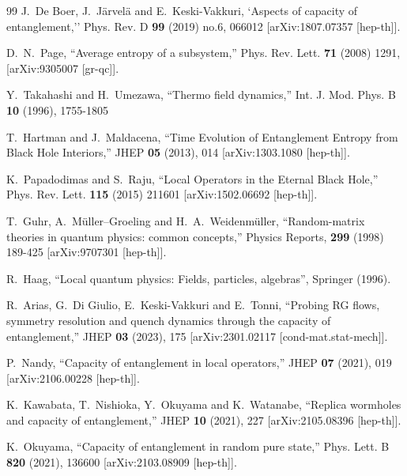 \documentclass[aps,prl,twocolumn,showpacs,preprintnumbers,amsmath,amssymb]{revtex4-1}
\begin{document}
\begin{thebibliography}{99}
J.~De Boer, J.~J\"arvel\"a and E.~Keski-Vakkuri,
`Aspects of capacity of entanglement,''
Phys. Rev. D \textbf{99} (2019) no.6, 066012
[arXiv:1807.07357 [hep-th]].

D.~N.~Page, ``Average entropy of a subsystem,''
Phys. Rev. Lett. \textbf{71} (2008) 1291,
[arXiv:9305007 [gr-qc]].
 
Y.~Takahashi and H.~Umezawa,
``Thermo field dynamics,''
Int. J. Mod. Phys. B \textbf{10} (1996), 1755-1805
  
T.~Hartman and J.~Maldacena,
``Time Evolution of Entanglement Entropy from Black Hole Interiors,''
JHEP \textbf{05} (2013), 014
[arXiv:1303.1080 [hep-th]].

K.~Papadodimas and S.~Raju, 
``Local Operators in the Eternal Black Hole,''
Phys. Rev. Lett. \textbf{115} (2015) 211601
[arXiv:1502.06692 [hep-th]].

T.~Guhr, A.~Müller–Groeling and H.~A.~Weidenmüller,
``Random-matrix theories in quantum physics: common concepts,''
Physics Reports, \textbf{299} (1998) 189-425
[arXiv:9707301 [hep-th]].

 R.~Haag, “Local quantum physics: Fields, particles, algebras”, Springer (1996).

R.~Arias, G.~Di Giulio, E.~Keski-Vakkuri and E.~Tonni,
``Probing RG flows, symmetry resolution and quench dynamics through the capacity of entanglement,''
JHEP \textbf{03} (2023), 175
[arXiv:2301.02117 [cond-mat.stat-mech]].

P.~Nandy,
``Capacity of entanglement in local operators,''
JHEP \textbf{07} (2021), 019
[arXiv:2106.00228 [hep-th]].

K.~Kawabata, T.~Nishioka, Y.~Okuyama and K.~Watanabe,
``Replica wormholes and capacity of entanglement,''
JHEP \textbf{10} (2021), 227
[arXiv:2105.08396 [hep-th]].

K.~Okuyama,
``Capacity of entanglement in random pure state,''
Phys. Lett. B \textbf{820} (2021), 136600
[arXiv:2103.08909 [hep-th]].


\end{thebibliography}
\end{document}
